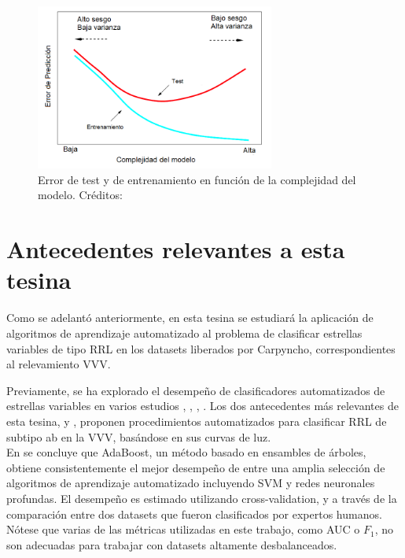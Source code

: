 \begin{figure}[h!]
\begin{center}
  \includegraphics[width=0.7\textwidth]{Kap1/tradeoff.png} 
  \end{center}
 \caption{ Error de test y de entrenamiento en función de la complejidad del modelo. Créditos: \protect\cite{statisticallearning} }
\label{fig:tradeoff}
\end{figure}

\section{Antecedentes relevantes a esta tesina}

\par Como se adelantó anteriormente, en esta tesina se estudiará la aplicación de algoritmos de aprendizaje automatizado al problema de clasificar estrellas variables de tipo RRL en los datasets liberados por Carpyncho, correspondientes al relevamiento VVV. \\

\par Previamente, se ha explorado el desempeño de clasificadores automatizados de estrellas variables en varios estudios \cite{ej1}, \cite{ej2}, \cite{ej3}, \cite{ej4}.  Los dos antecedentes más relevantes de esta tesina, \cite{elorrieta} y \cite{jbc}, proponen procedimientos automatizados para clasificar RRL de subtipo ab en la VVV, basándose en sus curvas de luz. \\

En \cite{elorrieta} se concluye que AdaBoost\cite{adaboost}, un método basado en ensambles de árboles, obtiene consistentemente el mejor desempeño de entre una amplia selección de algoritmos de aprendizaje automatizado incluyendo SVM y redes neuronales profundas. El desempeño es estimado utilizando cross-validation, y a través de la comparación entre dos datasets que fueron clasificados por expertos humanos. Nótese que varias de las métricas utilizadas en este trabajo, como AUC o $F_1$, no son adecuadas para trabajar con datasets altamente desbalanceados. \\

